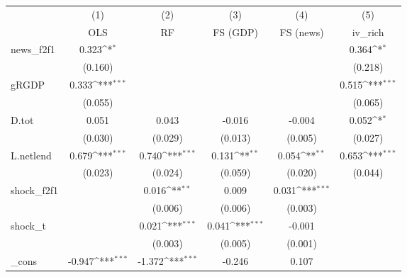 {
\def\sym#1{\ifmmode^{#1}\else\(^{#1}\)\fi}
\begin{tabular}{l*{5}{c}}
\toprule
            &\multicolumn{1}{c}{(1)}&\multicolumn{1}{c}{(2)}&\multicolumn{1}{c}{(3)}&\multicolumn{1}{c}{(4)}&\multicolumn{1}{c}{(5)}\\
            &\multicolumn{1}{c}{OLS}&\multicolumn{1}{c}{RF}&\multicolumn{1}{c}{FS (GDP)}&\multicolumn{1}{c}{FS (news)}&\multicolumn{1}{c}{iv\_rich}\\
\midrule
news\_f2f1   &       0.323\sym{*}  &                     &                     &                     &       0.364\sym{*}  \\
            &     (0.160)         &                     &                     &                     &     (0.218)         \\
\addlinespace
gRGDP       &       0.333\sym{***}&                     &                     &                     &       0.515\sym{***}\\
            &     (0.055)         &                     &                     &                     &     (0.065)         \\
\addlinespace
D.tot       &       0.051         &       0.043         &      -0.016         &      -0.004         &       0.052\sym{*}  \\
            &     (0.030)         &     (0.029)         &     (0.013)         &     (0.005)         &     (0.027)         \\
\addlinespace
L.netlend   &       0.679\sym{***}&       0.740\sym{***}&       0.131\sym{**} &       0.054\sym{**} &       0.653\sym{***}\\
            &     (0.023)         &     (0.024)         &     (0.059)         &     (0.020)         &     (0.044)         \\
\addlinespace
shock\_f2f1  &                     &       0.016\sym{**} &       0.009         &       0.031\sym{***}&                     \\
            &                     &     (0.006)         &     (0.006)         &     (0.003)         &                     \\
\addlinespace
shock\_t     &                     &       0.021\sym{***}&       0.041\sym{***}&      -0.001         &                     \\
            &                     &     (0.003)         &     (0.005)         &     (0.001)         &                     \\
\addlinespace
\_cons      &      -0.947\sym{***}&      -1.372\sym{***}&      -0.246         &       0.107         &                     \\

\end{tabular}}
